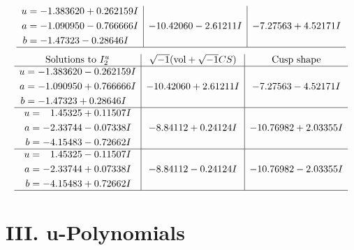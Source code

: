 \documentclass[1p]{elsarticle_modified}
\theoremstyle{definition}
\newcommand{\I}{\sqrt{-1}}
\begin{document}
$$\begin{array}{c|c|c}
\begin{aligned}
u &= -1.383620 + 0.262159 I \\
a &= -1.090950 - 0.766666 I \\
b &= -1.47323 - 0.28646 I\end{aligned}
 & -10.42060 - 2.61211 I & -7.27563 + 4.52171 I\\
 \hline 
 \end{array}$$\newpage$$\begin{array}{c|c|c}  
\text{Solutions to }I^u_{2}& \I (\text{vol} + \sqrt{-1}CS) & \text{Cusp shape}\\
 \hline 
\begin{aligned}
u &= -1.383620 - 0.262159 I \\
a &= -1.090950 + 0.766666 I \\
b &= -1.47323 + 0.28646 I\end{aligned}
 & -10.42060 + 2.61211 I & -7.27563 - 4.52171 I \\ \hline\begin{aligned}
u &= \phantom{-}1.45325 + 0.11507 I \\
a &= -2.33744 - 0.07338 I \\
b &= -4.15483 - 0.72662 I\end{aligned}
 & -8.84112 + 0.24124 I & -10.76982 + 2.03355 I \\ \hline\begin{aligned}
u &= \phantom{-}1.45325 - 0.11507 I \\
a &= -2.33744 + 0.07338 I \\
b &= -4.15483 + 0.72662 I\end{aligned}
 & -8.84112 - 0.24124 I & -10.76982 - 2.03355 I\\
 \hline 
 \end{array}$$\newpage
\newpage\renewcommand{\arraystretch}{1}
\centering \section*{ III. u-Polynomials}
\end{document}
